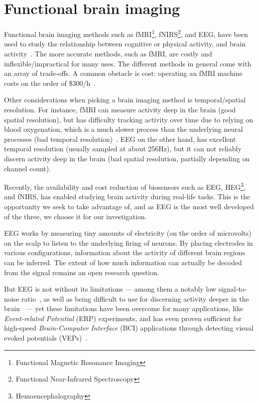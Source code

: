
\section{Functional brain imaging}\label{section:imaging}

    Functional brain imaging methods such as fMRI\footnote{Functional Magnetic Resonance Imaging}, fNIRS\footnote{Functional Near-Infrared Spectroscopy}, and EEG, have been used to study the relationship between cognitive or physical activity, and brain activity~\cite{floyd_decoding_2017}\cite{hong_classification_2015}\cite{fucci_replication_2019}. The more accurate methods, such as fMRI, are costly and inflexible/impractical for many uses. The different methods in general come with an array of trade-offs. A common obstacle is cost: operating an fMRI machine costs on the order of \$300/h~\cite{fucci_replication_2019}. 

    Other considerations when picking a brain imaging method is temporal/spatial resolution. For instance, fMRI can measure activity deep in the brain (good spatial resolution), but has difficulty tracking activity over time due to relying on blood oxygenation, which is a much slower process than the underlying neural processes (bad temporal resolution)~\cite{glover_overview_2011}. EEG on the other hand, has excellent temporal resolution (usually sampled at about 256Hz), but it can not reliably discern activity deep in the brain (bad spatial resolution, partially depending on channel count).

    Recently, the availability and cost reduction of biosensors such as EEG, HEG\footnote{Hemoencephalography}, and fNIRS, has enabled studying brain activity during real-life tasks. This is the opportunity we seek to take advantage of, and as EEG is the most well developed of the three, we choose it for our investigation.

    EEG works by measuring tiny amounts of electricity (on the order of microvolts) on the scalp to listen to the underlying firing of neurons. By placing electrodes in various configurations, information about the activity of different brain regions can be inferred. The extent of how much information can actually be decoded from the signal remains an open research question.

    But EEG is not without its limitations --- among them a notably low signal-to-noise ratio~\cite{mcfarland_eeg-based_2017}, as well as being difficult to use for discerning activity deeper in the brain~\cite{fahimi_hnazaee_localization_2020} --- yet these limitations have been overcome for many applications, like \emph{Event-related Potential} (ERP) experiments, and has even proven sufficient for high-speed \emph{Brain-Computer Interface} (BCI) applications through detecting visual evoked potentials (VEPs)~\cite{spuler_high-speed_2017}.

